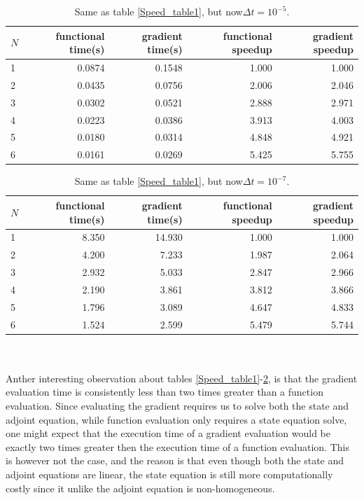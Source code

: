 \begin{table}[!h]
\centering
\caption{Same as table \ref{Speed_table1}, but now$\Delta t=10^{-5}$.\label{Speed_table3}}
\begin{tabular}{lrrrr}
\toprule
{} $N$&  functional time(s) &  gradient time(s) &  functional speedup &  gradient speedup \\
\midrule
1 &           0.0874 &          0.1548 &            1.000 &          1.000 \\
2 &           0.0435 &          0.0756 &            2.006 &          2.046 \\
3 &           0.0302 &          0.0521 &            2.888 &          2.971 \\
4 &           0.0223 &          0.0386 &            3.913 &          4.003 \\
5 &           0.0180 &          0.0314 &            4.848 &          4.921 \\
6 &           0.0161 &          0.0269 &            5.425 &          5.755 \\
\bottomrule
\end{tabular}
\end{table}
\begin{table}[!h]
\centering
\caption{Same as table \ref{Speed_table1}, but now$\Delta t=10^{-7}$.}
\label{speed_table_end}
\begin{tabular}{lrrrr}
\toprule
{}$N$ &  functional time(s) &  gradient time(s) &  functional speedup &  gradient speedup \\
\midrule
1 &           8.350 &         14.930 &            1.000 &          1.000 \\
2 &           4.200 &          7.233 &            1.987 &          2.064 \\
3 &           2.932 &          5.033 &            2.847 &          2.966 \\
4 &           2.190 &          3.861 &            3.812 &          3.866 \\
5 &           1.796 &          3.089 &            4.647 &          4.833 \\
6 &           1.524 &          2.599 &            5.479 &          5.744 \\
\bottomrule
\end{tabular}
\end{table}
\\
\\
Anther interesting observation about tables \ref{Speed_table1}-\ref{speed_table_end}, is that the gradient evaluation time is consistently less than two times greater than a function evaluation. Since evaluating the gradient requires us to solve both the state and adjoint equation, while function evaluation only requires a state equation solve, one might expect that the execution time of a gradient evaluation would be exactly two times greater then the execution time of a function evaluation. This is however not the case, and the reason is that even though both the state and adjoint equations are linear, the state equation is still more computationally costly since it unlike the adjoint equation is non-homogeneous.
